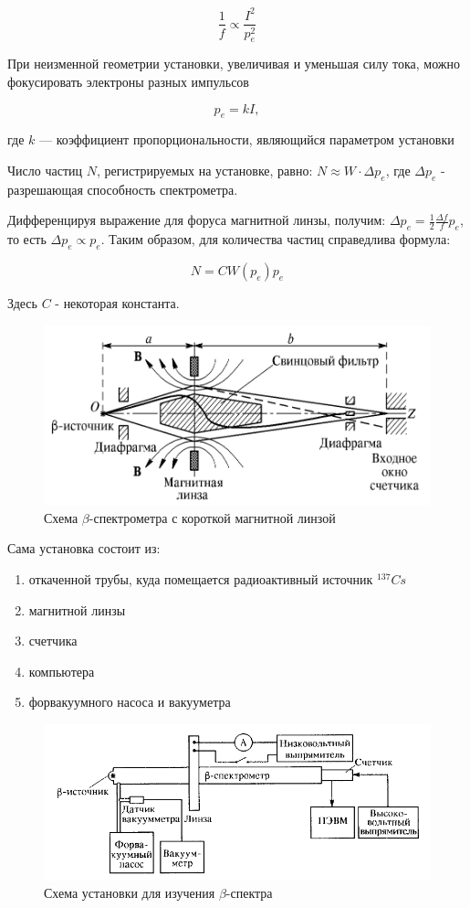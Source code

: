 \documentclass[a4paper,12pt]{article}
\begin{document}
	\[ \frac{1}{f} \propto \frac{I^2}{p_e^2} \]  
	
	При неизменной геометрии установки, увеличивая и уменьшая силу тока, можно фокусировать электроны разных импульсов 
	
	\begin{equation*}\label{k}
	p_e = kI,
	\end{equation*}
	
	 где $k$ --- коэффициент пропорциональности, являющийся параметром установки
	 
	 Число частиц $N$, регистрируемых на установке, равно: $N \approx W \cdot \Delta p_e$, где $\Delta p_e$ - разрешающая способность спектрометра.
	 
	  Дифференцируя выражение для форуса магнитной линзы, получим: $\Delta p_e = \frac{1}{2}\frac{\Delta f}{f}p_e$, то есть $\Delta p_e \propto p_e$. Таким образом, для количества частиц справедлива формула: 

\begin{equation*}\label{N}
 N = CW(p_e)p_e 
\end{equation*}

Здесь $C$ - некоторая константа.
\begin{figure}[h!]
\centering
\includegraphics[scale=0.5]{setup.png}
\caption{Схема $\beta$-спектрометра с короткой магнитной линзой}
\end{figure} 

Сама установка состоит из:
\begin{enumerate}
\itemsep0em
\item откаченной трубы, куда помещается радиоактивный источник $^{137}Cs$ 
\item магнитной линзы
\item счетчика
\item компьютера
\item форвакуумного насоса и вакууметра 
\end{enumerate}
\begin{figure}[h!]
\centering
\includegraphics[scale=0.7]{setup (1).png}
\caption{Схема установки для изучения $\beta$-спектра}
\end{figure} 
\end{document}
